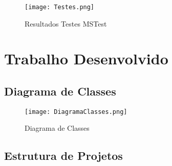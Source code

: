 \documentclass[11pt]{scrartcl} %
\begin{document}
\begin{figure}[h] %
	\centering
	\texttt{[image: Testes.png]} %
	\caption{Resultados Testes MSTest}
\end{figure}

\newpage

\section{Trabalho Desenvolvido}
\subsection{Diagrama de Classes}
\begin{figure}[h] %
	\centering
	\texttt{[image: DiagramaClasses.png]} %
	\caption{Diagrama de Classes}
\end{figure}

\newpage

\subsection{Estrutura de Projetos}
\end{document}
